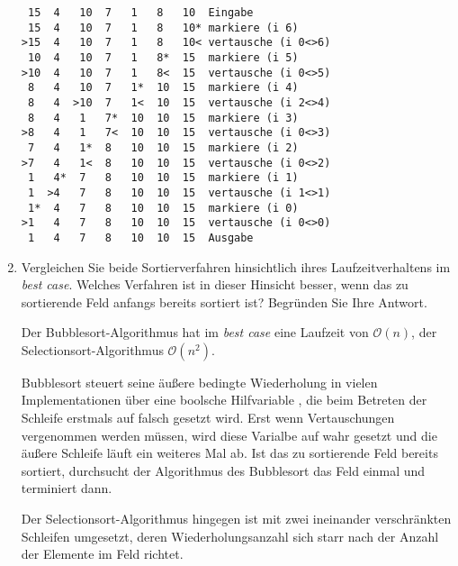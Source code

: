 \documentclass{bschlangaul-aufgabe}
\begin{document}
\begin{enumerate}
\begin{liAntwort}
\begin{verbatim}
 15  4   10  7   1   8   10  Eingabe
 15  4   10  7   1   8   10* markiere (i 6)
>15  4   10  7   1   8   10< vertausche (i 0<>6)
 10  4   10  7   1   8*  15  markiere (i 5)
>10  4   10  7   1   8<  15  vertausche (i 0<>5)
 8   4   10  7   1*  10  15  markiere (i 4)
 8   4  >10  7   1<  10  15  vertausche (i 2<>4)
 8   4   1   7*  10  10  15  markiere (i 3)
>8   4   1   7<  10  10  15  vertausche (i 0<>3)
 7   4   1*  8   10  10  15  markiere (i 2)
>7   4   1<  8   10  10  15  vertausche (i 0<>2)
 1   4*  7   8   10  10  15  markiere (i 1)
 1  >4   7   8   10  10  15  vertausche (i 1<>1)
 1*  4   7   8   10  10  15  markiere (i 0)
>1   4   7   8   10  10  15  vertausche (i 0<>0)
 1   4   7   8   10  10  15  Ausgabe
\end{verbatim}
\end{liAntwort}


\item Vergleichen Sie beide Sortierverfahren hinsichtlich ihres
Laufzeitverhaltens im \emph{best case}. Welches Verfahren ist in dieser
Hinsicht besser, wenn das zu sortierende Feld anfangs bereits sortiert
ist? Begründen Sie Ihre Antwort.

\begin{liAntwort}
Der Bubblesort-Algorithmus hat im \emph{best case} eine Laufzeit von
$\mathcal{O}(n)$, der Selectionsort-Algorithmus $\mathcal{O}(n^2)$.

Bubblesort steuert seine äußere bedingte Wiederholung in vielen
Implementationen über eine boolsche Hilfvariable ,
die beim Betreten der Schleife erstmals auf falsch gesetzt wird. Erst
wenn Vertauschungen vergenommen werden müssen, wird diese Varialbe auf
wahr gesetzt und die äußere Schleife läuft ein weiteres Mal ab. Ist das
zu sortierende Feld bereits sortiert, durchsucht der Algorithmus des
Bubblesort das Feld einmal und terminiert dann.

Der Selectionsort-Algorithmus hingegen ist mit zwei ineinander
verschränkten Schleifen umgesetzt, deren Wiederholungsanzahl sich starr
nach der Anzahl der Elemente im Feld richtet.




\end{liAntwort}

\end{enumerate}
\end{document}
